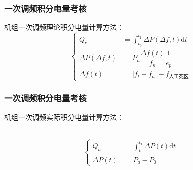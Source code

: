 \documentclass[aspectratio=43, 10pt, utf8, mathserif]{beamer}
\begin{document}
	\begin{frame}
		\frametitle{一次调频积分电量考核}
		机组一次调频理论积分电量计算方法：
		\begin{equation}
			\left\{	\begin{aligned}
				 Q_{e}&=\int_{t_{0}}^{t_{1}} \Delta P(\Delta f,t)\mathrm{d}t\\
				\Delta P(\Delta f,t)&=P_{n}\dfrac{\Delta f(t)}{f_{n}}\dfrac{1}{e_{p}}\\
				\Delta f(t)&=|f_{t}-f_{n}|-f_{\texttt{人工死区}}\nonumber
			\end{aligned}\right.
		\end{equation}
	\end{frame}

	\begin{frame}
	\frametitle{一次调频积分电量考核}
	\zihao{3}
	机组一次调频实际积分电量计算方法：
	
	\ \\
	
	\zihao{4}
	\begin{equation}
		\left\{	\begin{aligned}
			Q_{a}&=\int_{t_{0}}^{t_{1}}\Delta P(t) \mathrm{d}t\\
		\Delta P(t)&=P_{a}-P_{0}\nonumber
		\end{aligned}\right.
	\end{equation}
\end{frame}
\end{document}
